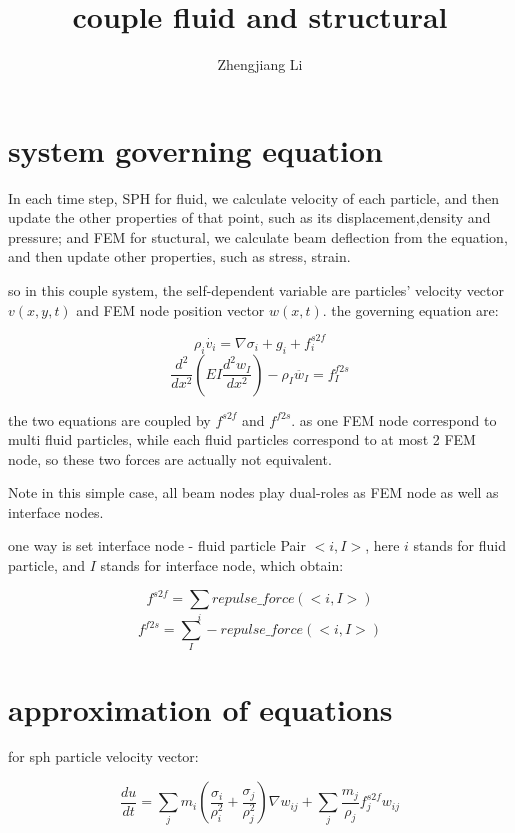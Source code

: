 \documentclass[11pt]{article}
\begin{document}
\title{couple fluid and structural}

\author{Zhengjiang Li}

\date{}

\maketitle



\section {system governing equation}

In each time step, SPH for fluid, we calculate velocity of each particle, and then update the other properties of that point, such as its displacement,density and  pressure; and FEM for stuctural, we calculate beam deflection from the equation, and then update other properties, such as stress, strain.

so in this couple system, the self-dependent variable are particles' velocity vector $v(x,y,t)$ and FEM node position vector $w(x,t)$. the governing equation are:

   $$	\rho _i \dot{v_i} = \nabla \sigma _i + g_i + f_i^{s2f} $$ 
   $$	\frac{d^2}{dx^2}(EI \frac{d^2w_I}{dx^2} )- \rho_I \ddot{w_I} = f_I^{f2s} $$

the two equations are coupled by $f^{s2f}$ and $f^{f2s}$. as one FEM node correspond to multi fluid particles, while each fluid particles correspond to at most 2 FEM node, so these two forces are actually not equivalent.


Note in this simple case, all beam nodes play dual-roles as FEM node as well as interface nodes. 

one way is set interface node - fluid particle Pair $<i, I>$, here $i$ stands for fluid particle, and $I$ stands for interface node, which obtain:

$$ f^{s2f} = \sum_i repulse\_force(<i,I>) $$
$$ f^{f2s} = \sum_I -repulse\_force(<i,I>) $$

\section{approximation of equations}

for sph particle velocity vector:

$$ \frac{du}{dt} = \sum_j m_i( \frac{\sigma_i}{\rho ^2 _i } + \frac{\sigma_j}{\rho^2 _j} )\nabla w_{ij} + \sum_j \frac{m_j}{\rho _j} f^{s2f}_j w_{ij} $$
\end{document}
